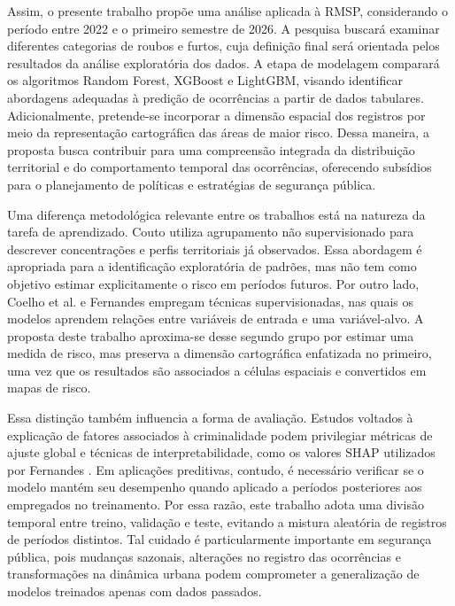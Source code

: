 \documentclass[12pt]{article}
\begin{document}
Assim, o presente trabalho propõe uma análise aplicada à RMSP, considerando o período entre 2022 e o primeiro semestre de 2026. A pesquisa buscará examinar diferentes categorias de roubos e furtos, cuja definição final será orientada pelos resultados da análise exploratória dos dados. A etapa de modelagem comparará os algoritmos Random Forest, XGBoost e LightGBM, visando identificar abordagens adequadas à predição de ocorrências a partir de dados tabulares. Adicionalmente, pretende-se incorporar a dimensão espacial dos registros por meio da representação cartográfica das áreas de maior risco. Dessa maneira, a proposta busca contribuir para uma compreensão integrada da distribuição territorial e do comportamento temporal das ocorrências, oferecendo subsídios para o planejamento de políticas e estratégias de segurança pública.

Uma diferença metodológica relevante entre os trabalhos está na natureza da tarefa de aprendizado. Couto \cite{couto2024identificaccao} utiliza agrupamento não supervisionado para descrever concentrações e perfis territoriais já observados. Essa abordagem é apropriada para a identificação exploratória de padrões, mas não tem como objetivo estimar explicitamente o risco em períodos futuros. Por outro lado, Coelho et al. \cite{de2025previsao} e Fernandes \cite{fernandes2025aplicaccao} empregam técnicas supervisionadas, nas quais os modelos aprendem relações entre variáveis de entrada e uma variável-alvo. A proposta deste trabalho aproxima-se desse segundo grupo por estimar uma medida de risco, mas preserva a dimensão cartográfica enfatizada no primeiro, uma vez que os resultados são associados a células espaciais e convertidos em mapas de risco.

Essa distinção também influencia a forma de avaliação. Estudos voltados à explicação de fatores associados à criminalidade podem privilegiar métricas de ajuste global e técnicas de interpretabilidade, como os valores SHAP utilizados por Fernandes \cite{fernandes2025aplicaccao}. Em aplicações preditivas, contudo, é necessário verificar se o modelo mantém seu desempenho quando aplicado a períodos posteriores aos empregados no treinamento. Por essa razão, este trabalho adota uma divisão temporal entre treino, validação e teste, evitando a mistura aleatória de registros de períodos distintos. Tal cuidado é particularmente importante em segurança pública, pois mudanças sazonais, alterações no registro das ocorrências e transformações na dinâmica urbana podem comprometer a generalização de modelos treinados apenas com dados passados.
\end{document}
